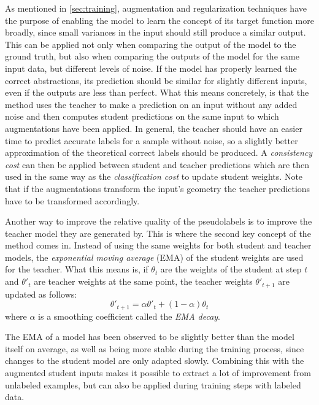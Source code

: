 As mentioned in \ref{sec:training}, augmentation and regularization techniques have the purpose of enabling the model to learn the concept of its target function more broadly, since small variances in the input should still produce a similar output. 
This can be applied not only when comparing the output of the model to the ground truth, but also when comparing the outputs of the model for the same input data, but different levels of noise. 
If the model has properly learned the correct abstractions, its prediction should be similar for slightly different inputs, even if the outputs are less than perfect.
What this means concretely, is that the method uses the teacher to make a prediction on an input without any added noise and then computes student predictions on the same input to which augmentations have been applied.
In general, the teacher should have an easier time to predict accurate labels for a sample without noise, so a slightly better approximation of the theoretical correct labels should be produced. 
A \emph{consistency cost} can then be applied between student and teacher predictions which are then used in the same way as the \emph{classification cost} to update student weights.
Note that if the augmentations transform the input's geometry the teacher predictions have to be transformed accordingly.

Another way to improve the relative quality of the pseudolabels is to improve the teacher model they are generated by.
This is where the second key concept of the method comes in.
Instead of using the same weights for both student and teacher models, the \emph{exponential moving average} (EMA) of the student weights are used for the teacher.
What this means is, if $\theta_t$ are the weights of the student at step $t$ and $\theta'_t$ are teacher weights at the same point, the teacher weights $\theta'_{t+1}$ are updated as follows:
$$
    \theta'_{t + 1} = \alpha\theta'_t + (1 - \alpha) \theta_t
$$
where $\alpha$ is a smoothing coefficient called the \emph{EMA decay}.

The EMA of a model has been observed to be slightly better than the model itself on average, as well as being more stable during the training process, since changes to the student model are only adapted slowly. Combining this with the augmented student inputs makes it possible to extract a lot of improvement from unlabeled examples, but can also be applied during training steps with labeled data. 

